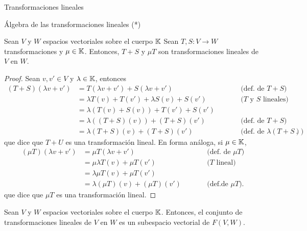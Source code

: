 \begin{chapter}{Transformaciones lineales}
\begin{section}{\'Algebra de las transformaciones lineales (*)}
            \begin{teorema}
                Sean $V$ y $W$ espacios vectoriales sobre el cuerpo $\mathbb K$ Sean $T,S : V \to W$ transformaciones y $\mu \in \mathbb K$. Entonces, $T + S$ y $\mu T$ son transformaciones lineales de $V$ en $W$.
            \end{teorema}
            \begin{proof}
                Sean $v,v' \in V$ y $\lambda \in \mathbb K$, entonces
                \begin{equation*}
                \begin{array}{rlll}
                    (T + S)(\lambda v + v') &= T(\lambda v + v') + S(\lambda v + v')&\qquad&\text{(def. de $T+S$)} \\
                    &= \lambda T(v) + T(v') + \lambda S(v) + S(v')& &\text{($T$ y $S$ lineales)}\\
                    &= \lambda (T(v) +S(v)) + T(v') + S(v')&&\text{}\\
                    &= \lambda ((T+S)(v)) + (T + S) (v')& &\text{(def. de $T+S$)}\\
                    &= \lambda(T + S)(v) +(T + S) (v')&&\text{(def. de $\lambda(T + S)$)}.
                \end{array}
                \end{equation*}
                que dice que $T + U$ es una transformación lineal. En forma análoga, si $\mu \in \mathbb K$, 
                \begin{equation*}
                \begin{array}{rlll}
                (\mu T)(\lambda v + v') &= \mu T(\lambda v + v')&\qquad&\text{(def. de $\mu T$)} \\
                &= \mu \lambda T(v) + \mu T(v') &\qquad&\text{($T$ lineal)}\\
                &=  \lambda \mu T(v) + \mu T(v')&\qquad&\text{}\\
                &= \lambda (\mu T)(v) + (\mu T)(v') &\qquad&\text{(def.de $\mu T$)}.
                \end{array}
                \end{equation*}
                que dice que $\mu T$ es una transformación lineal.
            \end{proof}
            
        \begin{corolario}
            Sean $V$ y $W$ espacios vectoriales sobre el cuerpo $\mathbb K$. Entonces, el conjunto de transformaciones lineales de $V$ en $W$ es un subespacio vectorial  de $F(V,W)$. 
        \end{corolario} 	
            

\end{section}
\end{chapter}
